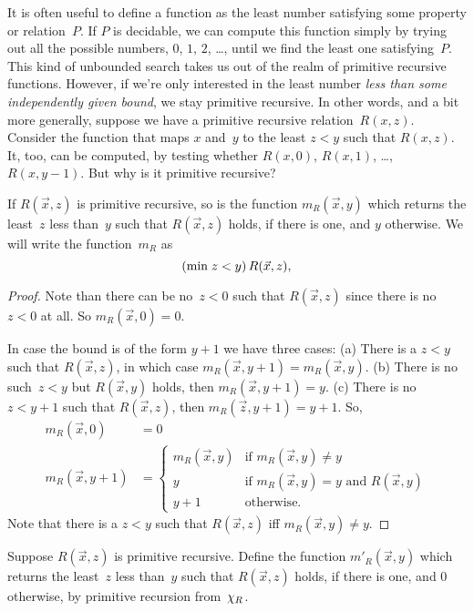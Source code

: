 \documentclass[../../../include/open-logic-section]{subfiles}
\begin{document}

\begin{explain}
It is often useful to define a function as the least number satisfying
some property or relation~$P$. If $P$ is decidable, we can compute
this function simply by trying out all the possible numbers, $0$, $1$,
$2$, \dots, until we find the least one satisfying~$P$.  This kind of
unbounded search takes us out of the realm of primitive recursive
functions. However, if we're only interested in the least number
\emph{less than some independently given bound}, we stay primitive
recursive. In other words, and a bit more generally, suppose we have a
primitive recursive relation~$R(x,z)$. Consider the function that maps
$x$ and~$y$ to the least $z < y$ such that $R(x, z)$. It, too, can be
computed, by testing whether $R(x, 0)$, $R(x, 1)$, \dots, $R(x, y-1)$.
But why is it primitive recursive?
\end{explain}

\begin{prop}
If $R(\vec x, z)$ is primitive recursive, so is the function
$m_R(\vec{x}, y)$ which returns the least~$z$ less than~$y$ such that
$R(\vec x, z)$ holds, if there is one, and $y$ otherwise.  We will
write the function~$m_R$ as
\[
(\mathrm{min} \; z < y)\, R(\vec{x}, z),
\]
\end{prop}

\begin{proof}
Note than there can be no~$z < 0$ such that $R(\vec{x}, z)$ since
there is no $z < 0$ at all.  So $m_R(\vec x, 0) = 0$.

In case the bound is of the form $y + 1$ we have three cases: (a)
There is a $z < y$ such that $R(\vec{x}, z)$, in which case
$m_R(\vec{x}, y+1) = m_R(\vec{x}, y)$. (b) There is no such~$z<y$ but
$R(\vec{x}, y)$ holds, then $m_R(\vec{x}, y+1) = y$. (c) There is no $z
< y+1$ such that $R(\vec{x}, z)$, then $m_R(\vec{z}, y+1) = y+1$. So,
\begin{align*}
m_R(\vec{x}, 0) & = 0\\
m_R(\vec{x}, y+1) & =
\begin{cases}
m_R(\vec{x}, y) & \text{if $m_R(\vec x, y) \neq y$}\\
y & \text{if $m_R(\vec x, y) = y$ and $R(\vec{x}, y)$}\\
y+1 & \text{otherwise.}
\end{cases}
\end{align*}
Note that there is a $z<y$ such that $R(\vec x, z)$ iff $m_R(\vec x,
y) \neq y$.
\end{proof}

\begin{prob}
Suppose $R(\vec x, z)$ is primitive recursive. Define the function
$m'_R(\vec{x}, y)$ which returns the least~$z$ less than~$y$ such that
$R(\vec{x}, z)$ holds, if there is one, and $0$ otherwise, by
primitive recursion from~$\chi_{R}$.
\end{prob}
\end{document}
